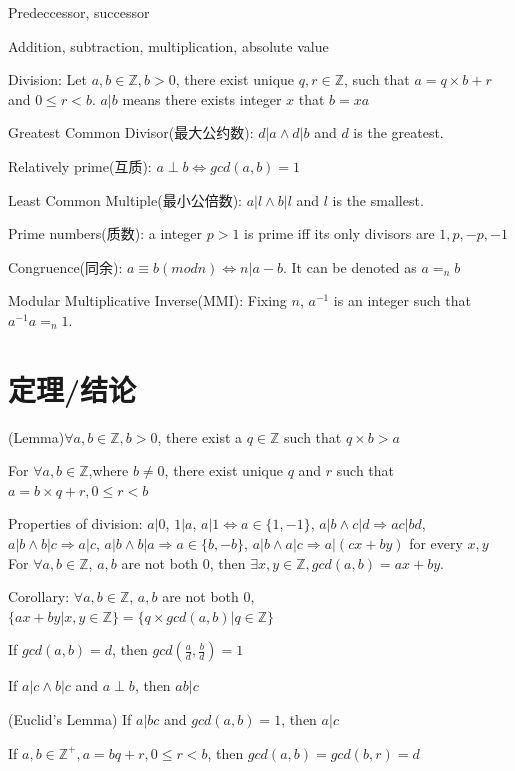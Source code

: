 \documentclass[12pt,a4paper]{ctexrep}
\begin{document}
Predeccessor, successor

Addition, subtraction, multiplication, absolute value

Division: Let $a,b \in \mathbb{Z}, b>0$, there exist unique $q,r \in \mathbb{Z}$, such that $a=q\times b+r$ and $0\leq r < b$. $a|b$ means there exists integer $x$ that $b = xa$

Greatest Common Divisor(最大公约数): $d|a \wedge d|b$ and $d$ is the greatest.

Relatively prime(互质): $a\perp b \Leftrightarrow gcd(a,b) = 1$

Least Common Multiple(最小公倍数): $a|l \wedge b|l$ and $l$ is the smallest.

Prime numbers(质数): a integer $p>1$ is prime iff its only divisors are $1,p,-p,-1$

Congruence(同余): $a\equiv b(mod n) \Leftrightarrow n|a-b$. It can be denoted as $a=_n b$

Modular Multiplicative Inverse(MMI): Fixing $n$, $a^{-1}$ is an integer such that $a^{-1}a =_n 1$.

\section{定理/结论}
(Lemma)$\forall a,b \in \mathbb{Z}, b>0$, there exist a $q \in \mathbb{Z}$ such that $q \times b >a$

For $\forall a,b \in \mathbb{Z}$,where $b \neq 0$, there exist unique $q$ and $r$ such that $a = b\times q+r, 0\leq r<b$

Properties of division:
$a|0$, $1|a$, $a|1 \Leftrightarrow a\in \{1,-1\}$, $a|b \wedge c|d \Rightarrow ac|bd$, $a|b \wedge b|c \Rightarrow a|c$, $a|b \wedge b|a \Rightarrow a \in \{b,-b\}$, $a|b \wedge a|c \Rightarrow a|(cx+by)$ for every $x,y$\\

For $\forall a,b \in \mathbb{Z}$, $a,b$ are not both 0, then $\exists x,y \in \mathbb{Z}, gcd(a,b) = ax+by$.

Corollary:
$\forall a,b \in \mathbb{Z}$, $a,b$ are not both 0, $\{ax+by|x,y \in \mathbb{Z}\} = \{q \times gcd(a,b)|q \in \mathbb{Z}\}$

If $gcd(a,b)=d$, then $gcd(\frac{a}{d},\frac{b}{d}) = 1$

If $a|c \wedge b|c$ and $a \perp b$, then $ab|c$

(Euclid's Lemma)
If $a|bc$ and $gcd(a,b) = 1$, then $a|c$

If $a,b \in \mathbb{Z}^+, a = bq+r, 0\leqslant r < b$, then $gcd(a,b) = gcd(b,r) = d$
\end{document}
